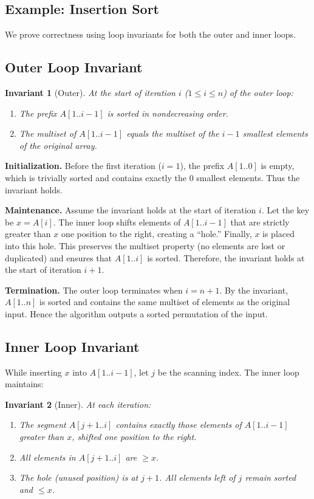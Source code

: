 \documentclass[9pt]{extarticle}
\newtheorem{invariant}{Invariant}
\begin{document}
\subsection{Example: Insertion Sort}
We prove correctness using loop invariants for both the outer and inner loops.

\subsection*{Outer Loop Invariant}

\begin{invariant}[Outer]
At the start of iteration $i$ ($1 \leq i \leq n$) of the outer loop:
\begin{enumerate}
    \item The prefix $A[1..i-1]$ is sorted in nondecreasing order.
    \item The multiset of $A[1..i-1]$ equals the multiset of the $i-1$ smallest elements of the original array.
\end{enumerate}
\end{invariant}

\textbf{Initialization.} Before the first iteration ($i=1$), the prefix $A[1..0]$ is empty, which is trivially sorted and contains exactly the $0$ smallest elements. Thus the invariant holds.

\textbf{Maintenance.} Assume the invariant holds at the start of iteration $i$.  
Let the key be $x = A[i]$. The inner loop shifts elements of $A[1..i-1]$ that are strictly greater than $x$ one position to the right, creating a ``hole.'' Finally, $x$ is placed into this hole. This preserves the multiset property (no elements are lost or duplicated) and ensures that $A[1..i]$ is sorted. Therefore, the invariant holds at the start of iteration $i+1$.

\textbf{Termination.} The outer loop terminates when $i=n+1$. By the invariant, $A[1..n]$ is sorted and contains the same multiset of elements as the original input. Hence the algorithm outputs a sorted permutation of the input.

\subsection*{Inner Loop Invariant}

While inserting $x$ into $A[1..i-1]$, let $j$ be the scanning index. The inner loop maintains:

\begin{invariant}[Inner]
At each iteration:
\begin{enumerate}
    \item The segment $A[j+1..i]$ contains exactly those elements of $A[1..i-1]$ greater than $x$, shifted one position to the right.
    \item All elements in $A[j+1..i]$ are $\geq x$.
    \item The hole (unused position) is at $j+1$. All elements left of $j$ remain sorted and $\leq x$.
\end{enumerate}
\end{invariant}
\end{document}
